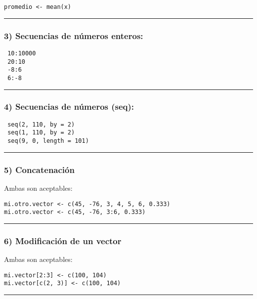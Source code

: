 \documentclass[]{article}
\begin{document}
\begin{verbatim}
promedio <- mean(x)
\end{verbatim}
\begin{center}\rule{3in}{0.4pt}\end{center}

\subsubsection{3) Secuencias de números enteros:}

\begin{verbatim}
 10:10000
 20:10
 -8:6
 6:-8
\end{verbatim}
\begin{center}\rule{3in}{0.4pt}\end{center}

\subsubsection{4) Secuencias de números (seq):}

\begin{verbatim}
 seq(2, 110, by = 2)
 seq(1, 110, by = 2)
 seq(9, 0, length = 101)
\end{verbatim}
\begin{center}\rule{3in}{0.4pt}\end{center}

\subsubsection{5) Concatenación}

Ambas son aceptables:

\begin{verbatim}
mi.otro.vector <- c(45, -76, 3, 4, 5, 6, 0.333)
mi.otro.vector <- c(45, -76, 3:6, 0.333)
\end{verbatim}
\begin{center}\rule{3in}{0.4pt}\end{center}

\subsubsection{6) Modificación de un vector}

Ambas son aceptables:

\begin{verbatim}
mi.vector[2:3] <- c(100, 104)
mi.vector[c(2, 3)] <- c(100, 104)
\end{verbatim}
\begin{center}\rule{3in}{0.4pt}\end{center}
\end{document}
